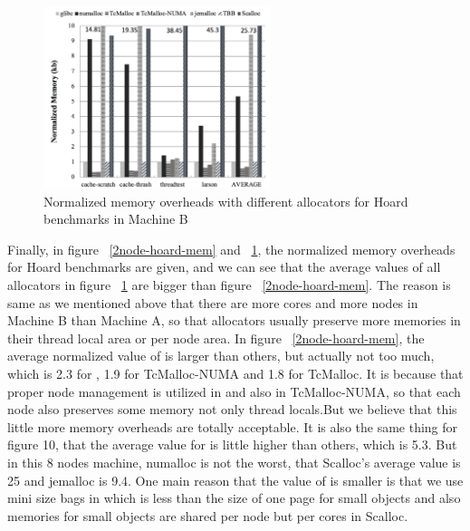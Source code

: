 \begin{figure}[H]
    \centering
    \includegraphics[width=\textwidth,height=200]{figure/8-node-hoard-mem.png}
    \caption{Normalized memory overheads with different allocators for Hoard benchmarks in Machine B}
    \label{8node-hoard-mem}
\end{figure}

Finally, in figure ~\ref{2node-hoard-mem} and ~\ref{8node-hoard-mem}, the normalized memory overheads for Hoard benchmarks are given, and we can see that the average values of all allocators in figure ~\ref{8node-hoard-mem} are bigger than figure ~\ref{2node-hoard-mem}. The reason is same as we mentioned above that there are more cores and more nodes in Machine B than Machine A, so that allocators usually preserve more memories in their thread local area or per node area. In figure ~\ref{2node-hoard-mem}, the average normalized value of \NM{} is larger than others, but actually not too much, which is 2.3 for \NM{}, 1.9 for TcMalloc-NUMA and 1.8 for TcMalloc. It is because that proper node management is utilized in \NM{} and also in TcMalloc-NUMA, so that each node also preserves some memory not only thread locals.But we believe that this little more memory overheads are totally acceptable. It is also the same thing for figure 10, that the average value for \NM{} is little higher than others, which is 5.3. But in this 8 nodes machine, numalloc is not the worst, that Scalloc's average value is 25 and jemalloc is 9.4. One main reason that the value of \NM{} is smaller is that we use mini size bags in \NM{} which is less than the size of one page for small objects and also memories for small objects are shared per node but per cores in Scalloc.

